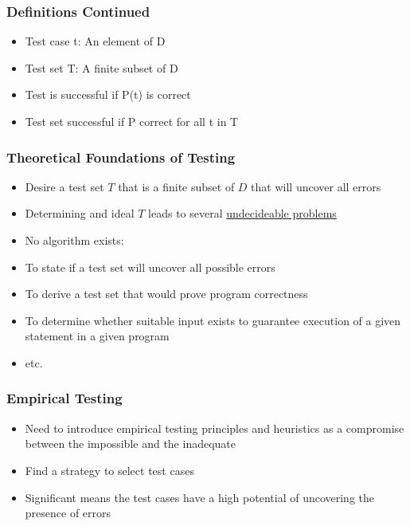\documentclass[t,12pt,numbers,fleqn]{beamer}
\begin{document}

\begin{frame}
\frametitle{Definitions Continued}
\begin{itemize}
\item Test case t: An element of D
\item Test set T: A finite subset of D
\item Test is successful if P(t) is correct
\item Test set successful if P correct for all t in T
\end{itemize}
\end{frame}


\begin{frame}
\frametitle{Theoretical Foundations of Testing}

\begin{itemize}
\item Desire a test set $T$ that is a finite subset of $D$ that will uncover all errors
\item Determining and ideal $T$ leads to several
  \href{https://en.wikipedia.org/wiki/Undecidable_problem}{undecideable
    problems}
\item No algorithm exists:
\bi
\item To state if a test set will uncover all possible errors
\item To derive a test set that would prove program correctness
\item To determine whether suitable input exists to guarantee execution of a
  given statement in a given program
\item etc.
\ei
\end{itemize}

\end{frame}


\begin{frame}
\frametitle{Empirical Testing}

\begin{itemize}
\item Need to introduce empirical testing principles and heuristics as a
  compromise between the impossible and the inadequate
\item Find a strategy to select  test cases
\item Significant means the test cases have a high potential of uncovering the
  presence of errors
\end{itemize}

\end{frame}
\end{document}
